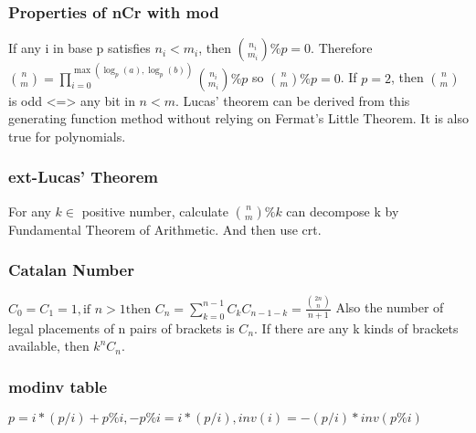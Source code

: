 \subsubsection{Properties of nCr with mod}
    If any i in base p satisfies $n_i<m_i$, then $\binom{n_i}{m_i}\%p=0$.
    Therefore $\binom{n}{m}=\prod_{i=0}^{\max(\log_p(a),\log_p(b))}\binom{n_i}{m_i}\%p$ so $\binom{n}{m}\%p=0$.
    If $p=2$, then $\binom{n}{m}$ is odd <=> any bit in $n<m$.
    Lucas' theorem can be derived from this generating function method without relying on Fermat's Little Theorem.
    It is also true for polynomials.
\subsubsection{ext-Lucas' Theorem}
    For any $k\in$ positive number, calculate $\binom{n}{m}\%k$ can decompose k by Fundamental Theorem of Arithmetic.
    And then use crt.
\subsubsection{Catalan Number}
    $C_0=C_1=1, \text{if }n>1\text{then }C_n=\sum_{k=0}^{n-1}C_kC_{n-1-k}=\frac{\binom{2n}{n}}{n+1}$
    Also the number of legal placements of n pairs of brackets is $C_n$.
    If there are any k kinds of brackets available, then $k^nC_n$.
\subsubsection{modinv table}
    $p=i*(p/i)+p\%i,-p\%i=i*(p/i),inv(i)=-(p/i)*inv(p\%i)$
